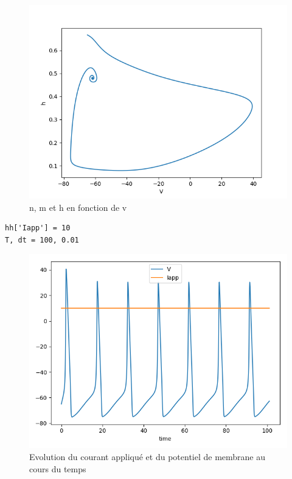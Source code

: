 \documentclass[12pt]{scrartcl}
\begin{document}
\begin{figure}[!h]
\begin{minipage}[l]{.3\linewidth}
\includegraphics[scale=0.35]{imgs/hh14.png}
    \end{minipage}\hfill
\caption{n, m et h en fonction de v}
\label{hh1234}
\end{figure}

\clearpage

\begin{lstlisting}[caption = {Simulation du modèle 2}]
hh['Iapp'] = 10
T, dt = 100, 0.01
\end{lstlisting}

\begin{figure}[!h]
\centering
\includegraphics[scale=0.4]{imgs/hh21.png}
\caption{Evolution du courant appliqué et du potentiel de membrane au cours du temps}
\label{hh21}
\end{figure}
\end{document}
